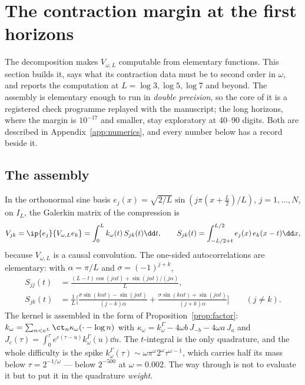 \section{The contraction margin at the first horizons}\label{sec:contraction}

The decomposition makes $V_{\omega,L}$ computable from elementary functions.
This section builds it, says what its contraction data must be to second order
in $\omega$, and reports the computation at $L=\log3,\log5,\log7$ and beyond.
The assembly is elementary enough to run in \emph{double precision}, so the
core of it is a registered check programme replayed with the manuscript; the
long horizons, where the margin is $10^{-17}$ and smaller, stay exploratory at
40--90 digits. Both are described in Appendix~\ref{app:numerics}, and every
number below has a record beside it.

\subsection{The assembly}\label{sec:assembly}

In the orthonormal sine basis $e_j(x)=\sqrt{2/L}\sin(j\pi(x+\frac L2)/L)$,
$j=1,\dots,N$, on $I_L$, the Galerkin matrix of the compression is
\begin{equation}\label{eq:galerkin}
 V_{jk}=\ip{e_j}{V_{\omega,L}e_k}=\int_0^Lk_\omega(t)\,S_{jk}(t)\dd t,\qquad
 S_{jk}(t)=\int_{-L/2+t}^{L/2}e_j(x)\,e_k(x-t)\dd x ,
\end{equation}
because $V_{\omega,L}$ is a causal convolution. The one-sided autocorrelations
are elementary: with $\alpha=\pi/L$ and $\sigma=(-1)^{j+k}$,
\begin{equation}\label{eq:S}
\begin{aligned}
 S_{jj}(t)&=\frac{(L-t)\cos(j\alpha t)+\sin(j\alpha t)/(j\alpha)}L,\\
 S_{jk}(t)&=\frac1L\Big[\frac{\sigma\sin(k\alpha t)-\sin(j\alpha t)}{(j-k)\alpha}
 +\frac{\sigma\sin(k\alpha t)+\sin(j\alpha t)}{(j+k)\alpha}\Big]\qquad(j\neq k).
\end{aligned}
\end{equation}
The kernel is assembled in the form of Proposition~\ref{prop:factor}:
$k_\omega=\sum_{n<e^L}\ct_n\kappa_\omega(\cdot-\log n)$ with
$\kappa_\omega=k^\Gamma_\omega-4\omega b\,J_{-b}-4\omega a\,J_a$ and
$J_c(\tau)=\int_0^\tau e^{c(\tau-u)}k^\Gamma_\omega(u)\dd u$. The $t$-integral is
the only quadrature, and the whole difficulty is the spike
$k^\Gamma_\omega(\tau)\sim\omega\pi^\omega2^\omega\tau^{\omega-1}$, which carries
half its mass below $\tau=2^{-1/\omega}$ --- below $2^{-500}$ at
$\omega=0.002$. The way through is not to evaluate it but to put it in the
quadrature \emph{weight}.

